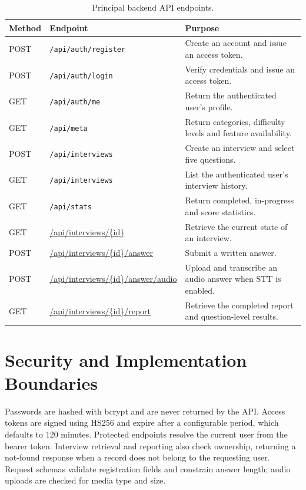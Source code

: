 \documentclass[12pt,a4paper,oneside]{report}
\begin{document}
\begin{table}[H]
\centering
\small
\begin{tabularx}{\textwidth}{>{\RaggedRight\arraybackslash}p{1.8cm} >{\RaggedRight\arraybackslash}p{5.1cm} X}
\toprule
\textbf{Method} & \textbf{Endpoint} & \textbf{Purpose} \\
\midrule
POST & \texttt{/api/auth/register} & Create an account and issue an access token. \\
POST & \texttt{/api/auth/login} & Verify credentials and issue an access token. \\
GET & \texttt{/api/auth/me} & Return the authenticated user's profile. \\
GET & \texttt{/api/meta} & Return categories, difficulty levels and feature availability. \\
POST & \texttt{/api/interviews} & Create an interview and select five questions. \\
GET & \texttt{/api/interviews} & List the authenticated user's interview history. \\
GET & \texttt{/api/stats} & Return completed, in-progress and score statistics. \\
GET & \url{/api/interviews/\{id\}} & Retrieve the current state of an interview. \\
POST & \url{/api/interviews/\{id\}/answer} & Submit a written answer. \\
POST & \url{/api/interviews/\{id\}/answer/audio} & Upload and transcribe an audio answer when STT is enabled. \\
GET & \url{/api/interviews/\{id\}/report} & Retrieve the completed report and question-level results. \\
\bottomrule
\end{tabularx}
\caption{Principal backend API endpoints.}
\label{tab:api-endpoints}
\end{table}

\section{Security and Implementation Boundaries}
Passwords are hashed with bcrypt and are never returned by the API. Access tokens are signed using HS256 and expire after a configurable period, which defaults to 120 minutes. Protected endpoints resolve the current user from the bearer token. Interview retrieval and reporting also check ownership, returning a not-found response when a record does not belong to the requesting user. Request schemas validate registration fields and constrain answer length; audio uploads are checked for media type and size.
\end{document}
